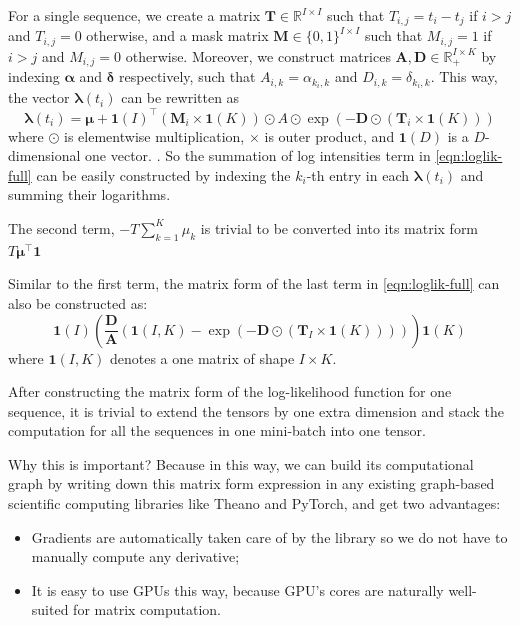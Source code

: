 \documentclass{article}
\renewcommand{\vec}[1]{{\boldsymbol{\mathbf{#1}}}}   %
\newcommand{\Real}{\mathbb{R}}
\begin{document}
For a single sequence, we create a matrix $\vec{T} \in \Real^{I \times I}$ such that $T_{i,j} = t_i - t_j$ if $i > j$ and $T_{i,j} = 0$ otherwise, and a mask matrix $\vec{M} \in \{0,1\}^{I \times I}$ such that $M_{i,j}=1$ if $i > j$ and $M_{i,j}=0$ otherwise. Moreover, we construct matrices $\vec{A}, \vec{D} \in \Real_{+}^{I \times K}$ by indexing $\vec{\alpha}$ and $\vec{\delta}$ respectively, such that $A_{i,k} = \alpha_{k_i, k}$ and $D_{i,k} = \delta_{k_i,k}$. This way, the vector $\vec{\lambda}(t_i)$ can be rewritten as
\begin{equation}
\vec{\lambda}(t_i) = \vec{\mu} + {\vec{1}(I)}^{\top} (\vec{M}_{i} \times \vec{1}(K)) \odot A \odot \exp{(-\vec{D} \odot (\vec{T}_i \times \vec{1}(K) ) )}
\end{equation}
where $\odot$ is elementwise multiplication, $\times$ is outer product, and $\vec{1}(D)$ is a $D$-dimensional one vector. . So the summation of log intensities term in \cref{eqn:loglik-full} can be easily constructed by indexing the $k_i$-th entry in each $\vec{\lambda}(t_i)$ and summing their logarithms. 

The second term, $-T \sum_{k=1}^{K} \mu_k$ is trivial to be converted into its matrix form $T \vec{\mu}^\top \vec{1}$ 

Similar to the first term, the matrix form of the last term in \cref{eqn:loglik-full} can also be constructed as:
\begin{equation}
\vec{1}(I) ( \frac{\vec{D}}{\vec{A}} (\vec{1}(I,K) - \exp(-\vec{D} \odot (\vec{T}_{I} \times \vec{1}(K) ) )) ) \vec{1}(K)
\end{equation}
where $\vec{1}(I,K)$ denotes a one matrix of shape $I \times K$. 

After constructing the matrix form of the log-likelihood function for one sequence, it is trivial to extend the tensors by one extra dimension and stack the computation for all the sequences in one mini-batch into one tensor. 

Why this is important? Because in this way, we can build its computational graph by writing down this matrix form expression in any existing graph-based scientific computing libraries like Theano and PyTorch, and get two advantages:
\begin{itemize}
\item Gradients are automatically taken care of by the library so we do not have to manually compute any derivative; 
\item It is easy to use GPUs this way, because GPU's cores are naturally well-suited for matrix computation. 
\end{itemize}
\end{document}
